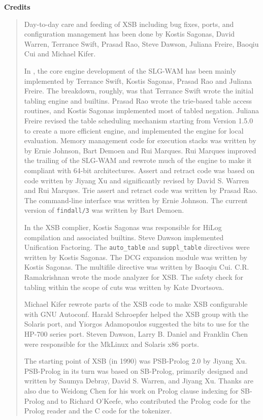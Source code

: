 
\begin{center}
{\bf {\Large 
		Credits
}}
\end{center}


\begin{quote}
Day-to-day care and feeding of XSB including bug fixes, ports, and
configuration management has been done by Kostis Sagonas, David
Warren, Terrance Swift, Prasad Rao, Steve Dawson, Juliana Freire, 
Baoqiu Cui and Michael Kifer.

In \version, the core engine development of the SLG-WAM has
been mainly implemented by Terrance Swift, Kostis Sagonas, Prasad Rao
and Juliana Freire.  The breakdown, roughly, was that Terrance Swift
wrote the initial tabling engine and builtins.  Prasad Rao wrote the
trie-based table access routines, and Kostis Sagonas implemented most
of tabled negation.  Juliana Freire revised the table scheduling
mechanism starting from Version 1.5.0 to create a more efficient
engine, and implemented the engine for local evaluation.  Memory
management code for execution stacks was written by by Ernie Johnson,
Bart Demoen and Rui Marques.  Rui Marques improved the trailing of the
SLG-WAM and rewrote much of the engine to make it compliant with
64-bit architectures.  Assert and retract code was based on code
written by Jiyang Xu and significantly revised by David S. Warren and
Rui Marques.  Trie assert and retract code was written by Prasad Rao.
The command-line interface was written by Ernie Johnson.  The current
version of {\tt findall/3} was written by Bart Demoen.

In the XSB complier, Kostis Sagonas was responsible for HiLog
compilation and associated builtins.  Steve Dawson implemented
Unification Factoring.  The {\tt auto\_table} and {\tt suppl\_table}
directives were written by Kostis Sagonas.  The DCG expansion module
was written by Kostis Sagonas.  The multifile directive was written by
Baoqiu Cui.  C.R. Ramakrishnan wrote the mode analyzer for XSB.  The
safety check for tabling within the scope of cuts was written by Kate
Dvortsova.

Michael Kifer rewrote parts of the XSB code to make XSB configurable with
GNU Autoconf.  Harald Schroepfer helped the XSB group with the Solaris
port, and Yiorgos Adamopoulos suggested the bits to use for the HP-700
series port.  Steven Dawson, Larry B. Daniel and Franklin Chen were
responsible for the MkLinux and Solaris x86 ports.

The starting point of XSB (in 1990) was PSB-Prolog 2.0 by Jiyang Xu.
PSB-Prolog in its turn was based on SB-Prolog, primarily designed and
written by Saumya Debray, David S. Warren, and Jiyang Xu.  Thanks are
also due to Weidong Chen for his work on Prolog clause indexing for
SB-Prolog and to Richard O'Keefe, who contributed the Prolog code for
the Prolog reader and the C code for the tokenizer.  

\end{quote}

